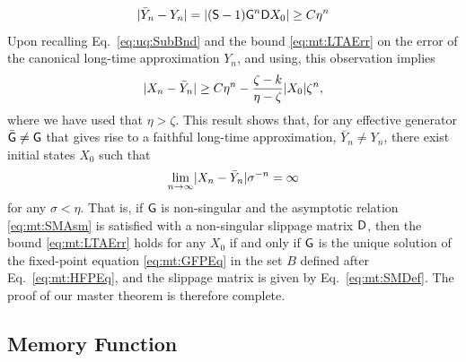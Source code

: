 \documentclass[aps,prl,reprint]{revtex4-2}
\begin{document}
\begin{align}
\label{eq:uq:DevBnd}
\lvert \bar{Y}_n - Y_n \rvert = \lvert (\mathsf{S}-1)\mathsf{G}^n\mathsf{D} X_0 \rvert  \geq C\eta^n
\end{align}
Upon recalling Eq.~\eqref{eq:uq:SubBnd} and the bound \eqref{eq:mt:LTAErr} on the error of the canonical long-time approximation $Y_n$, and using, this observation implies
\begin{equation}
\lvert X_n-\bar{Y}_n \rvert\geq C \eta^n- \frac{\zeta-k}{\eta-\zeta}\lvert X_0 \rvert\zeta^n,
\end{equation}
where we have used that $\eta > \zeta$.
This result shows that, for any effective generator $\bar{\mathsf{G}}\neq\mathsf{G}$ that gives rise to a faithful long-time approximation, $\bar{Y}_n\neq Y_n$, there exist initial states $X_0$ such that
\begin{equation}
\lim_{n\rightarrow\infty}\lvert X_n - \bar{Y}_n \rvert\sigma^{-n} = \infty
\end{equation}
for any $\sigma<\eta$.
That is, if $\mathsf{G}$ is non-singular and the asymptotic relation \eqref{eq:mt:SMAsm} is satisfied with a non-singular slippage matrix $\mathsf{D}$, then the bound \eqref{eq:mt:LTAErr} holds for any $X_0$ if and only if $\mathsf{G}$ is the unique solution of the fixed-point equation \eqref{eq:mt:GFPEq} in the set $B$ defined after Eq.~\eqref{eq:mt:HFPEq}, and the slippage matrix is given by Eq.~\eqref{eq:mt:SMDef}.
The proof of our master theorem is therefore complete.

\subsection{Memory Function}

\newcommand{\vphx}{\vphantom{\sX}}
\end{document}
